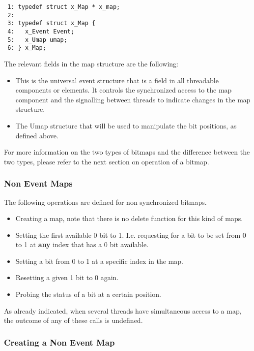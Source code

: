 \bcode
\begin{verbatim}
 1: typedef struct x_Map * x_map;
 2:
 3: typedef struct x_Map {
 4:   x_Event Event;
 5:   x_Umap umap;
 6: } x_Map;
\end{verbatim}
\ecode

The relevant fields in the map structure are the following:

\begin{itemize}
\item {} This is the universal event structure that is a field
in all threadable components or elements. It controls the synchronized access
to the map component and the signalling between threads to indicate changes
in the map structure.
\item {} The Umap structure that will be used
to manipulate the bit positions, as defined above.
\end{itemize}

For more information on the two types of bitmaps and the difference between
the two types, please refer to the next section on operation of a bitmap.

\subsubsection{Non Event Maps}

The following operations are defined for non synchronized bitmaps.

\begin{itemize}
\item Creating a map, note that there is no delete function for this kind of
maps.
\item Setting the first available 0 bit to 1. I.e. requesting for a bit to
be set from 0 to 1 at \textbf{any} index that has a 0 bit available.
\item Setting a bit from 0 to 1 at a specific index in the map.
\item Resetting a given 1 bit to 0 again.
\item Probing the status of a bit at a certain position.
\end{itemize}

As already indicated, when several threads have simultaneous access to a
map, the outcome of any of these calls is undefined.

\subsubsection{Creating a Non Event Map}

